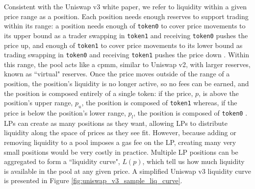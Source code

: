\documentclass[11pt]{article}
\begin{document}
Consistent with the Uniswap v3 white paper, we refer to liquidity within a given price range as a position. Each position needs enough reserves to support trading within its range: a position needs enough of \texttt{token0} to cover price movements to its upper bound as a trader swapping in \texttt{token1} and receiving \texttt{token0} pushes the price up, and enough of \texttt{token1} to cover price movements to its lower bound as trading swapping in \texttt{token0} and receiving \texttt{token1} pushes the price down \citep{Uniswapv3}. Within this range, the pool acts like a \gls{cpmm}, similar to Uniswap v2, with larger reserves, known as ``virtual" reserves. Once the price moves outside of the range of a position, the position's liquidity is no longer active, so no fees can be earned, and the position is composed entirely of a single token: if the price, $p$, is above the position's upper range, $p_u$, the position is composed of \texttt{token1} whereas, if the price is below the position's lower range, $p_l$, the position is composed of \texttt{token0} \citep{Uniswapv3}. LPs can create as many positions as they want, allowing LPs to distribute liquidity along the space of prices as they see fit. However, because adding or removing liquidity to a pool imposes a gas fee on the LP, creating many very small positions would be very costly in practice. Multiple LP positions can be aggregated to form a ``liquidity curve", $L(p)$, which tell us how much liquidity is available in the pool at any given price. A simplified Uniswap v3 liquidity curve is presented in Figure \ref{fig:uniswap_v3_sample_liq_curve}.
\end{document}
